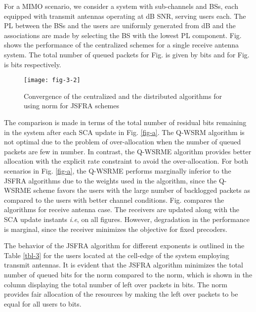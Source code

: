 For a \ac{MIMO} scenario, we consider a system with  sub-channels and  \acp{BS}, each equipped with  transmit antennas operating at dB \ac{SNR}, serving  users each. The \ac{PL} between the \acp{BS} and the users are uniformly generated from \me{[0,-3]} dB and the associations are made by selecting the \ac{BS} with the lowest \ac{PL} component. Fig.  shows the performance of the centralized schemes for a single receive antenna system. The total number of queued packets for Fig.  is given by  bits and for Fig.  is  bits respectively.
\begin{figure}
	\centering
	\texttt{[image: fig-3-2]}
	\caption{Convergence of the centralized and the distributed algorithms for  using  norm for \ac{JSFRA} schemes}
	\label{fig-d}
\end{figure}

The comparison is made in terms of the total number of residual bits remaining in the system after each \ac{SCA} update in Fig. \ref{fig-a}. The \ac{Q-WSRM} algorithm is not optimal due to the problem of over-allocation when the number of queued packets are few in number. In contrast, the \ac{Q-WSRME} algorithm provides better allocation with the explicit rate constraint to avoid the over-allocation. For both scenarios in Fig. \ref{fig-a}, the \ac{Q-WSRME} performs marginally inferior to the \ac{JSFRA} algorithms due to the weights used in the algorithm, since the \ac{Q-WSRME} scheme favors the users with the large number of backlogged packets as compared to the users with better channel conditions. Fig.  compares the algorithms for  receive antenna case. The receivers are updated along with the \ac{SCA} update instants \textit{i.e},  on all figures. However, degradation in the performance is marginal, since the receiver minimizes the objective for fixed precoders.

The behavior of the \ac{JSFRA} algorithm for different exponents  is outlined in the Table \ref{tbl-3} for the users located at the cell-edge of the system employing  transmit antennas. It is evident that the \ac{JSFRA} algorithm minimizes the total number of queued bits for the  norm compared to the  norm, which is shown in the column displaying the total number of left over packets \me{\chi} in bits. The \me{\ell_{\infty}} norm provides fair allocation of the resources by making the left over packets to be equal for all users to  bits.
